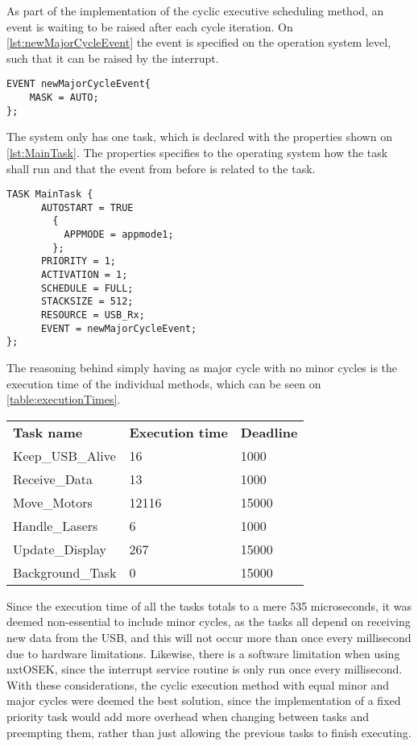 As part of the implementation of the cyclic executive scheduling method, an event is waiting to be raised after each cycle iteration.
On \autoref{lst:newMajorCycleEvent} the event is specified on the operation system level, such that it can be raised by the interrupt.
\begin{lstlisting}[language=CSharp,label={lst:newMajorCycleEvent},caption={newMajorCycleEvent event from nxt.oil}]
EVENT newMajorCycleEvent{
    MASK = AUTO;
};
\end{lstlisting}

The system only has one task, which is declared with the properties shown on \autoref{lst:MainTask}.
The properties specifies to the operating system how the task shall run and that the event from before is related to the task.
\begin{lstlisting}[language=CSharp,label={lst:MainTaskoil},caption={MainTaks task from nxt.oil}]
    TASK MainTask {
      AUTOSTART = TRUE
        {
          APPMODE = appmode1;
        };
      PRIORITY = 1;
      ACTIVATION = 1;
      SCHEDULE = FULL;
      STACKSIZE = 512;
      RESOURCE = USB_Rx;
      EVENT = newMajorCycleEvent;
};
\end{lstlisting}

The reasoning behind simply having as major cycle with no minor cycles is the execution time of the individual methods, which can be seen on \autoref{table:executionTimes}.

\begin{table}[H]
\begin{tabular}{lll}
\textbf{Task name}  & \textbf{Execution time} & \textbf{Deadline} \\
Keep\_USB\_Alive    & 16     	& 1000                    \\
Receive\_Data       & 13       & 1000                    \\
Move\_Motors        & 12116    & 15000                   \\
Handle\_Lasers      & 6        & 1000                    \\
Update\_Display     & 267      & 15000                   \\
Background\_Task	 & 0	    & 15000					   \\
\end{tabular}
\end{table}\label{table:executionTimes}

Since the execution time of all the tasks totals to a mere 535 microseconds, it was deemed non-essential to include minor cycles, as the tasks all depend on receiving new data from the USB, and this will not occur more than once every millisecond due to hardware limitations.
Likewise, there is a software limitation when using nxtOSEK, since the interrupt service routine is only run once every millisecond.
With these considerations, the cyclic execution method with equal minor and major cycles were deemed the best solution, since the implementation of a fixed priority task would add more overhead when changing between tasks and preempting them, rather than just allowing the previous tasks to finish executing.

